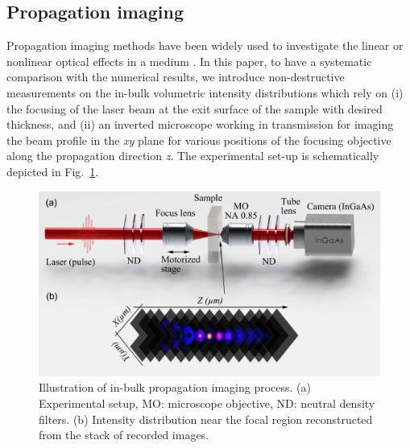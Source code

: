 \documentclass[9pt,twocolumn,twoside]{osajnl}
\begin{document}
\subsection{ Propagation imaging}
Propagation imaging methods have been widely used to investigate the linear or nonlinear optical effects in a medium \cite{pasquier2015handling, fedorov2016accessing, wang2020ultrafast,Chambonneau2020}. In this paper, to have a systematic comparison with the numerical results, we introduce non-destructive measurements on the in-bulk volumetric intensity distributions which rely on (i) the focusing of the laser beam at the exit surface of the sample with desired thickness, and (ii) an inverted microscope working in transmission for imaging the beam profile in the \textit{xy} plane for various positions of the focusing objective along the propagation direction \textit{z}. The experimental set-up is schematically depicted in Fig.~\ref{fig:2}.
\begin{figure}
	\centering
	\includegraphics[width=\linewidth]{setup.pdf}
	\caption{Illustration of in-bulk propagation imaging process. (a) Experimental setup, MO: microscope objective, ND: neutral density filters. (b) Intensity distribution near the focal region reconstructed from the stack of recorded images.}\label{fig:2}
\end{figure}
\end{document}
